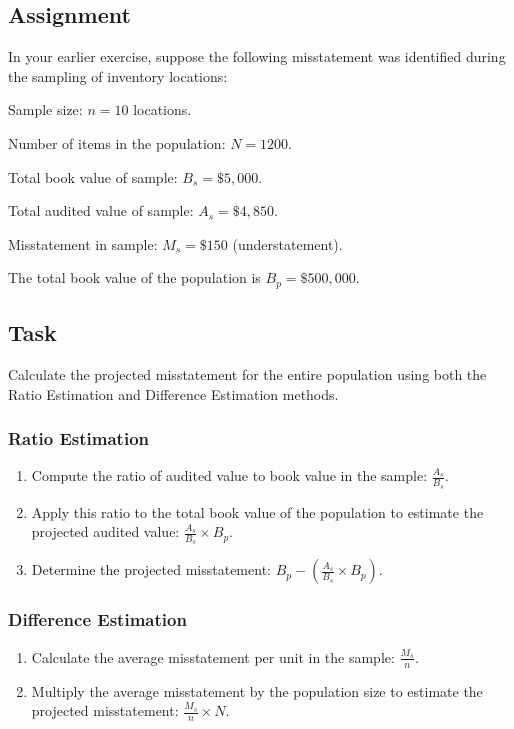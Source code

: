 \documentclass[11pt,a4paper,openany]{memoir}
\begin{document}
\subsection*{Assignment}
In your earlier exercise, suppose the following misstatement was identified during the sampling of inventory locations:

\begin{compactitem}
    \item Sample size: $n = 10$ locations.
    \item Number of items in the population: $N = 1200$.
    \item Total book value of sample: $B_s = \$5,000$.
    \item Total audited value of sample: $A_s = \$4,850$.
    \item Misstatement in sample: $M_s = \$150$ (understatement).
\end{compactitem}

The total book value of the population is $B_p = \$500,000$.

\subsection*{Task}
Calculate the projected misstatement for the entire population using both the Ratio Estimation and Difference Estimation methods.

\subsubsection*{Ratio Estimation}
\begin{enumerate}
    \item Compute the ratio of audited value to book value in the sample: $\frac{A_s}{B_s}$.
    \item Apply this ratio to the total book value of the population to estimate the projected audited value: $\frac{A_s}{B_s} \times B_p$.
    \item Determine the projected misstatement: $B_p - \left( \frac{A_s}{B_s} \times B_p \right)$.
\end{enumerate}

\subsubsection*{Difference Estimation}
\begin{enumerate}
    \item Calculate the average misstatement per unit in the sample: $\frac{M_s}{n}$.
    \item Multiply the average misstatement by the population size to estimate the projected misstatement: $\frac{M_s}{n} \times N$.
\end{enumerate}
\end{document}
